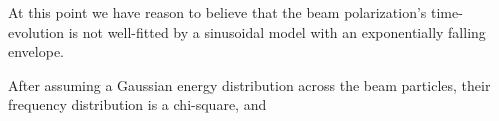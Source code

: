 \documentclass{article}
\begin{document}
At this point we have reason to believe that the beam polarization's time-evolution is not well-fitted by a sinusoidal model with an exponentially falling envelope. 

After assuming a Gaussian energy distribution across the beam particles, their frequency distribution is a chi-square, and 
\end{document}
